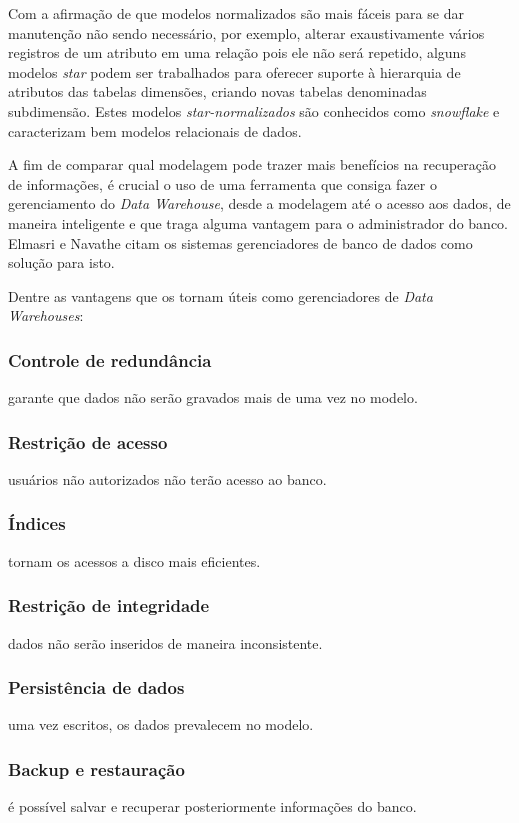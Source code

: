 \documentclass[conference]{IEEEtran}
\begin{document}
Com a afirmação de que modelos normalizados são mais fáceis para se dar manutenção não sendo necessário, por exemplo, alterar exaustivamente vários registros de um atributo em uma relação pois ele não será repetido, alguns modelos \textit{star} podem ser trabalhados para oferecer suporte à hierarquia de atributos das tabelas dimensões, criando novas tabelas denominadas subdimensão. Estes modelos \textit{star-normalizados} são conhecidos como \textit{snowflake} e caracterizam bem modelos relacionais de dados.

A fim de comparar qual modelagem pode trazer mais benefícios na recuperação de informações, é crucial o uso de uma ferramenta que consiga fazer o gerenciamento do \textit{Data Warehouse}, desde a modelagem até o acesso aos dados, de maneira inteligente e que traga alguma vantagem para o administrador do banco. Elmasri e Navathe \cite{navathe2011banco} citam os sistemas gerenciadores de banco de dados como solução para isto.

Dentre as vantagens que os tornam úteis como gerenciadores de \textit{Data Warehouses}:

\subsubsection{Controle de redundância} garante que dados não serão gravados mais de uma vez no modelo.
\subsubsection{Restrição de acesso} usuários não autorizados não terão acesso ao banco.
\subsubsection{Índices} tornam os acessos a disco mais eficientes.
\subsubsection{Restrição de integridade} dados não serão inseridos de maneira inconsistente.
\subsubsection{Persistência de dados} uma vez escritos, os dados prevalecem no modelo.
\subsubsection{Backup e restauração} é possível salvar e recuperar posteriormente informações do banco.
\end{document}
